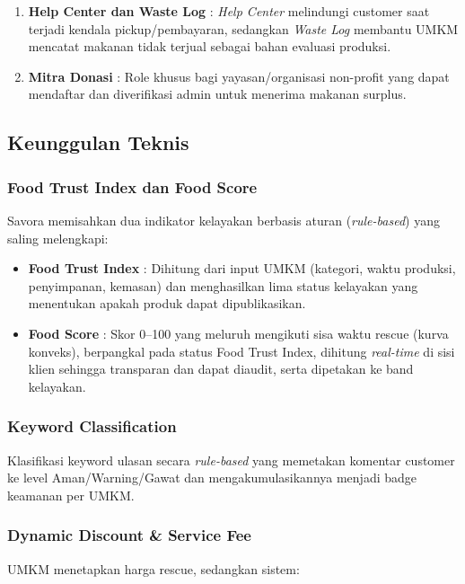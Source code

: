 \begin{enumerate}[leftmargin=*]
    \item \textbf{Help Center dan Waste Log} : \textit{Help Center} melindungi customer saat terjadi
    kendala pickup/pembayaran, sedangkan \textit{Waste Log} membantu UMKM mencatat makanan tidak
    terjual sebagai bahan evaluasi produksi.

    \item \textbf{Mitra Donasi} : Role khusus bagi yayasan/organisasi non-profit yang dapat mendaftar
    dan diverifikasi admin untuk menerima makanan surplus.
\end{enumerate}

\subsection{Keunggulan Teknis}

\subsubsection{Food Trust Index dan Food Score}
Savora memisahkan dua indikator kelayakan berbasis aturan (\textit{rule-based}) yang saling
melengkapi:

\begin{itemize}[leftmargin=*]
    \item \textbf{Food Trust Index} : Dihitung dari input UMKM (kategori, waktu produksi, penyimpanan,
    kemasan) dan menghasilkan lima status kelayakan yang menentukan apakah produk dapat dipublikasikan.
    \item \textbf{Food Score} : Skor 0--100 yang meluruh mengikuti sisa waktu rescue (kurva konveks),
    berpangkal pada status Food Trust Index, dihitung \textit{real-time} di sisi klien sehingga
    transparan dan dapat diaudit, serta dipetakan ke band kelayakan.
\end{itemize}

\subsubsection{Keyword Classification}
Klasifikasi keyword ulasan secara \textit{rule-based} yang memetakan komentar customer ke level
Aman/Warning/Gawat dan mengakumulasikannya menjadi badge keamanan per UMKM.

\subsubsection{Dynamic Discount \& Service Fee}
UMKM menetapkan harga rescue, sedangkan sistem:

